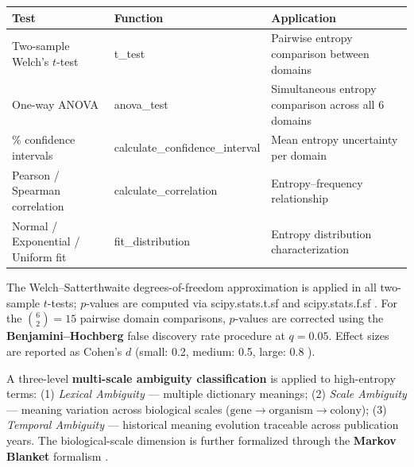 \documentclass[
]{article}
\newcounter{none} %
\numberwithin{equation}{section}
\renewcommand{\texttt}[1]{%
    \colorbox{codebg}{\color{codefg}\ttfamily #1}%
}
\begin{document}
{\def\LTcaptype{none} %
\begin{longtable}[]{@{}
  >{\raggedright\arraybackslash}p{}
  >{\raggedright\arraybackslash}p{}
  >{\raggedright\arraybackslash}p{}@{}}
\toprule\noalign{}
\begin{minipage}[b]{\linewidth}\raggedright
Test
\end{minipage} & \begin{minipage}[b]{\linewidth}\raggedright
Function
\end{minipage} & \begin{minipage}[b]{\linewidth}\raggedright
Application
\end{minipage} \\
\midrule\noalign{}
\endhead
\bottomrule\noalign{}
\endlastfoot
Two-sample Welch's \(t\)-test & \texttt{t\_test} & Pairwise entropy
comparison between domains \\
One-way ANOVA & \texttt{anova\_test} & Simultaneous entropy comparison
across all 6 domains \\
95\% confidence intervals & \texttt{calculate\_confidence\_interval} &
Mean entropy uncertainty per domain \\
Pearson / Spearman correlation & \texttt{calculate\_correlation} &
Entropy--frequency relationship \\
Normal / Exponential / Uniform fit & \texttt{fit\_distribution} &
Entropy distribution characterization \\
\end{longtable}
}

The Welch--Satterthwaite degrees-of-freedom approximation is applied in
all two-sample \(t\)-tests; \(p\)-values are computed via
\texttt{scipy.stats.t.sf} and \texttt{scipy.stats.f.sf}. For the
\(\binom{6}{2} = 15\) pairwise domain comparisons, \(p\)-values are
corrected using the \textbf{Benjamini--Hochberg} false discovery rate
procedure at \(q = 0.05\). Effect sizes are reported as Cohen's \(d\)
(small: 0.2, medium: 0.5, large: 0.8 \cite{cohen1988statistical}).

A three-level \textbf{multi-scale ambiguity classification} is applied
to high-entropy terms: (1) \emph{Lexical Ambiguity} --- multiple
dictionary meanings; (2) \emph{Scale Ambiguity} --- meaning variation
across biological scales
(\(\text{gene} \to \text{organism} \to \text{colony}\)); (3)
\emph{Temporal Ambiguity} --- historical meaning evolution traceable
across publication years. The biological-scale dimension is further
formalized through the \textbf{Markov Blanket} formalism
\cite{friston2013life}.
\end{document}
